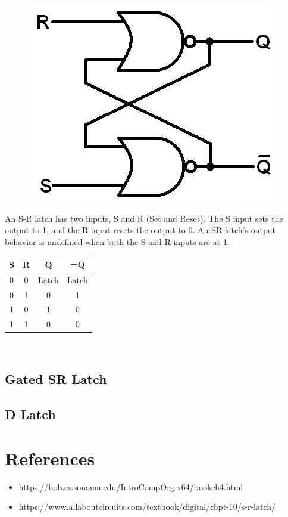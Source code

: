 \begin{figure}[h!]
	\includegraphics[scale=0.35]{./img/sr-latch.png}
\end{figure}

An S-R latch has two inputs, S and R (Set and Reset). The S input sets the output to 1, and the R input resets the output to 0. An SR latch's output behavior is undefined when both the S and R inputs are at 1. \\

\begin{tabular}{c c c c}
	\hline
	\textbf{S} & \textbf{R} & \textbf{Q} & \textbf{¬Q} \\ 
	\hline
	0 & 0 & Latch & Latch\\
	0 & 1 & 0 & 1\\
	1 & 0 & 1 & 0 \\
	1 & 1 & 0 & 0 \\
	\hline 
\end{tabular} \\

\subsection{Gated SR Latch}

\subsection{D Latch}

\section{References}

\begin{itemize}
	\item https://bob.cs.sonoma.edu/IntroCompOrg-x64/bookch4.html
	\item https://www.allaboutcircuits.com/textbook/digital/chpt-10/s-r-latch/
\end{itemize}